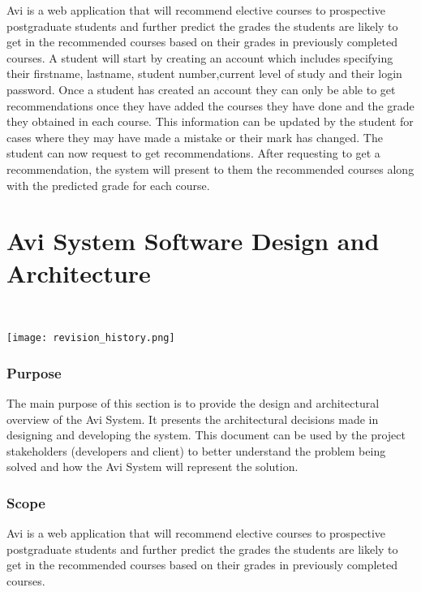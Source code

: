 \documentclass[10pt]{article}
\begin{document}
Avi is a web application that will recommend elective courses to prospective postgraduate students and further predict the grades the students are likely to get in the recommended courses based on their grades in previously completed courses. A student will start by creating an account which includes specifying their firstname, lastname, student number,current level of study and their login password. Once a student has created an account they can only be able to get recommendations once they have added the courses they have done and the grade they obtained in each course. This information can be updated by the student for cases where they may have made a mistake or their mark has changed. The student can now request to get recommendations. After requesting to get a recommendation, the system will present to them the recommended courses along with the predicted grade for each course.

\section{Avi System Software Design and Architecture} \\


\begin{center}
\texttt{[image: revision\_history.png]}
\end{center}



\subsubsection{Purpose}

The main purpose of this section is to provide the design and architectural overview of the Avi System. It presents the architectural decisions made in designing and developing the system. This document can be used by the project stakeholders (developers and client) to better understand the problem being solved and how the Avi System will represent the solution.

\subsubsection{Scope}

Avi is a web application that will recommend elective courses to prospective postgraduate students and further predict the grades the students are likely to get in the recommended courses based on their grades in previously completed courses.
\end{document}
